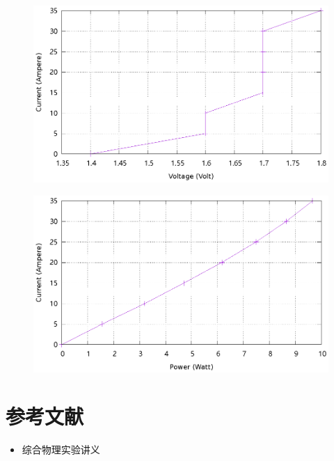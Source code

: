 \documentclass{ctexart}
\begin{document}
\begin{figure}[H]
    \centering
    \includegraphics[width=0.9\linewidth]{../output/led-vc-8.gnuplot}
\end{figure}
\begin{figure}[H]
    \centering
    \includegraphics[width=0.9\linewidth]{../output/led-pc-8.gnuplot}
\end{figure}
\newpage


\section{参考文献}
\begin{itemize}[leftmargin=0pt]
    \item[] 综合物理实验讲义
\end{itemize}
\end{document}
